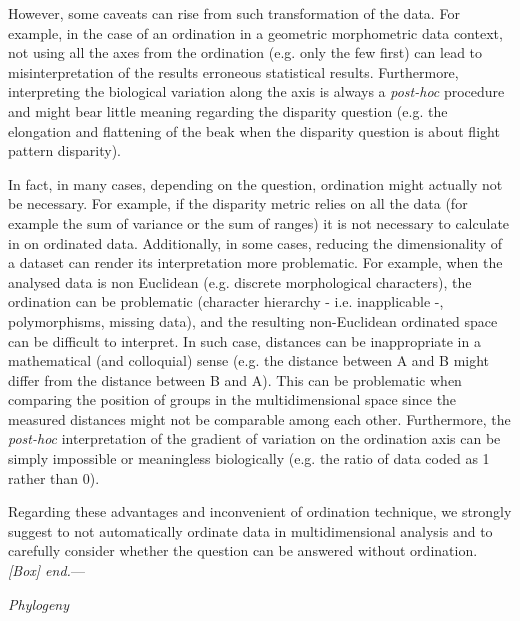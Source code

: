 \documentclass[12pt,letterpaper]{article}
\renewcommand{\subsection}[1]{%
\bigskip
\begin{center}
\begin{large}
\normalfont\itshape #1
\end{large}
\end{center}}
\renewcommand{\subsubsection}[1]{%
\vspace{2ex}
\noindent
\textit{#1.}---}
\begin{document}
However, some caveats can rise from such transformation of the data.
For example, in the case of an ordination in a geometric morphometric data context, not using all the axes from the ordination (e.g. only the few first) can lead to misinterpretation of the results erroneous statistical results.
Furthermore, interpreting the biological variation along the axis is always a \textit{post-hoc} procedure and might bear little meaning regarding the disparity question (e.g. the elongation and flattening of the beak when the disparity question is about flight pattern disparity).

In fact, in many cases, depending on the question, ordination might actually not be necessary.
For example, if the disparity metric relies on all the data (for example the sum of variance or the sum of ranges) it is not necessary to calculate in on ordinated data.
Additionally, in some cases, reducing the dimensionality of a dataset can render its interpretation more problematic.
For example, when the analysed data is non Euclidean (e.g. discrete morphological characters), the ordination can be problematic (character hierarchy - i.e. inapplicable -, polymorphisms, missing data), and the resulting non-Euclidean ordinated space can be difficult to interpret.
In such case, distances can be inappropriate in a mathematical (and colloquial) sense (e.g. the distance between A and B might differ from the distance between B and A).
This can be problematic when comparing the position of groups in the multidimensional space since the measured distances might not be comparable among each other.
Furthermore, the \textit{post-hoc} interpretation of the gradient of variation on the ordination axis can be simply impossible or meaningless biologically (e.g. the ratio of data coded as 1 rather than 0).

Regarding these advantages and inconvenient of ordination technique, we strongly suggest to not automatically ordinate data in multidimensional analysis and to carefully consider whether the question can be answered without ordination.
\subsubsection{[Box] end}

\subsection{Phylogeny}
\end{document}
